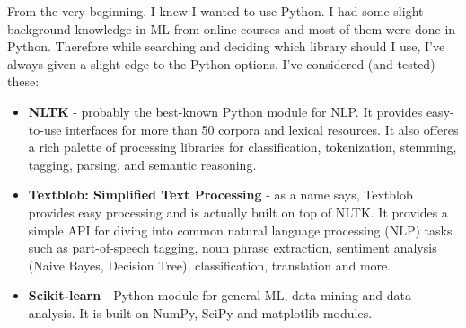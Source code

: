 From the very beginning, I knew I wanted to use Python. I had some slight background knowledge in ML from online courses and most of them were done in Python. Therefore while searching and deciding which library should I use, I've always given a slight edge to the Python options. I've considered (and tested) these:
\begin{itemize}
\item \textbf{NLTK} - probably the best-known Python module for NLP. It provides easy-to-use interfaces for more than 50 corpora and lexical resources. It also offeres a rich palette of processing libraries for classification, tokenization, stemming, tagging, parsing, and semantic reasoning.
\item \textbf{Textblob: Simplified Text Processing} - as a name says, Textblob provides easy processing and is actually built on top of NLTK. It provides a simple API for diving into common natural language processing (NLP) tasks such as part-of-speech tagging, noun phrase extraction, sentiment analysis (Naive Bayes, Decision Tree), classification, translation and more.
\item \textbf{Scikit-learn} - Python module for general ML, data mining and data analysis. It is built on NumPy, SciPy and matplotlib modules.
\end{itemize}